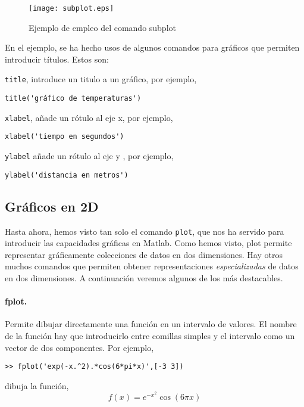 \begin{figure}[h]
\centering
\texttt{[image: subplot.eps]}
\caption{Ejemplo de empleo del comando subplot}
\label{fig:subplot}
\end{figure}

En el ejemplo, se ha hecho usos de algunos comandos para gráficos que permiten introducir títulos. Estos son: 

\texttt{title}, introduce un titulo a un gráfico, por ejemplo,
\begin{verbatim}
title('gráfico de temperaturas')
\end{verbatim}

\texttt{xlabel}, añade un rótulo al eje x, por ejemplo,

\begin{verbatim}
xlabel('tiempo en segundos')
\end{verbatim}

\texttt{ylabel} añade un rótulo al eje y , por ejemplo,
\begin{verbatim}
ylabel('distancia en metros')
\end{verbatim}

\subsection{Gráficos en 2D} 
Hasta ahora, hemos visto tan solo el comando \texttt{plot}, que nos ha servido para introducir las capacidades gráficas en Matlab. Como hemos visto, plot permite representar gráficamente colecciones de datos en dos dimensiones. Hay otros muchos comandos que permiten obtener representaciones \emph{especializadas} de datos en dos dimensiones. A continuación veremos algunos de los más destacables.

\paragraph{fplot.} Permite dibujar directamente una función en un intervalo de valores. El nombre de la función hay que introducirlo entre comillas simples y el intervalo como un vector de dos componentes. Por ejemplo,

\begin{verbatim}
>> fplot('exp(-x.^2).*cos(6*pi*x)',[-3 3])
\end{verbatim}

dibuja la función,
\begin{equation*}
f(x)=e^{-x^2}\cos(6\pi x)
\end{equation*}

